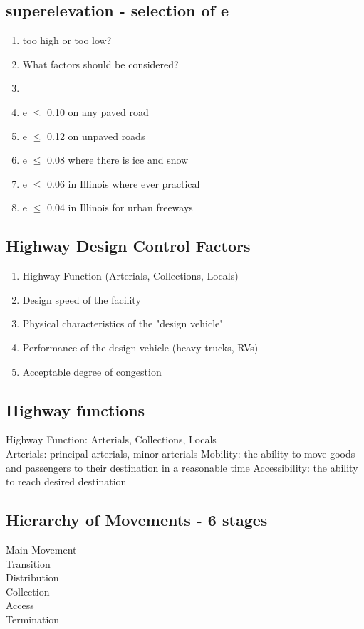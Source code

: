 \documentclass{article}
\begin{document}
  \subsection{superelevation - selection of e}
  \begin{enumerate}
    \item too high or too low?
    \item What factors should be considered?
    \item 
    \item e $\leq$ 0.10 on any paved road
    \item e $\leq$ 0.12 on unpaved roads
    \item e $\leq$ 0.08 where there is ice and snow
    \item e $\leq$ 0.06 in Illinois where ever practical
    \item e $\leq$ 0.04 in Illinois for urban freeways
  \end{enumerate}

  \subsection{Highway Design Control Factors}
  \begin{enumerate}
    \item Highway Function (Arterials, Collections, Locals)
    \item Design speed of the facility
    \item Physical characteristics of the "design vehicle" 
    \item Performance of the design vehicle (heavy trucks, RVs)
    \item Acceptable degree of congestion
  \end{enumerate}

  \subsection{Highway functions}
    Highway Function: Arterials, Collections, Locals \\
    Arterials: principal arterials, minor arterials
    Mobility: the ability to move goods and passengers to their destination in a reasonable time 
    Accessibility: the ability to reach desired destination

  \subsection{Hierarchy of Movements - 6 stages}
  Main Movement \\
  Transition \\
  Distribution \\
  Collection \\
  Access \\
  Termination \\
\end{document}
